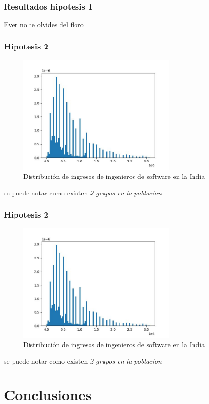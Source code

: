 \documentclass{beamer}
\begin{document}
\begin{frame}
\frametitle{Resultados hipotesis 1}
  Ever no te olvides del floro
\end{frame}

\begin{frame}
\frametitle{Hipotesis 2}
\begin{figure}[h]
  \caption{Distribución de ingresos de ingenieros de
  software en la India}
  \includegraphics[width=8cm]{distribucion_ingresos_sw.jpeg}
\end{figure}

  se puede notar como existen \textit{2 grupos en la poblacion}
\end{frame}


\begin{frame}
\frametitle{Hipotesis 2}
\begin{figure}[h]
  \caption{Distribución de ingresos de ingenieros de
  software en la India}
  \includegraphics[width=8cm]{distribucion_ingresos_sw.jpeg}
\end{figure}

  se puede notar como existen \textit{2 grupos en la poblacion}
\end{frame}
\section{Conclusiones}
\end{document}

